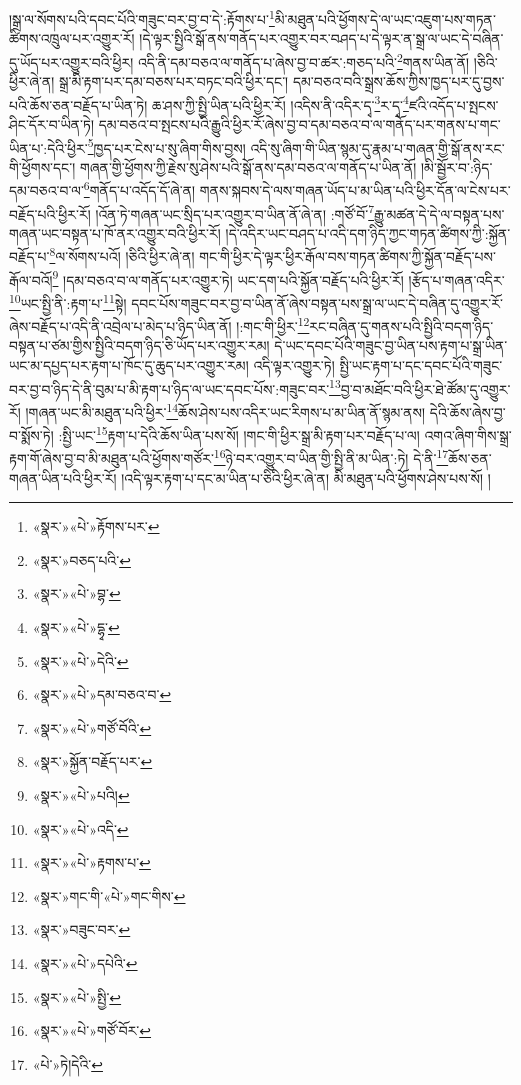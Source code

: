 །སྒྲ་ལ་སོགས་པའི་དབང་པོའི་གཟུང་བར་བྱ་བ་དེ་:རྟོགས་པ་\footnote{«སྣར་»«པེ་»རྟོགས་པར་}མི་མཐུན་པའི་ཕྱོགས་དེ་ལ་ཡང་འཇུག་པས་གཏན་ཚིགས་འཁྲུལ་པར་འགྱུར་རོ། །དེ་ལྟར་སྤྱིའི་སྒོ་ནས་གནོད་པར་འགྱུར་བར་བཤད་པ་དེ་ལྟར་ན་སྒྲ་ལ་ཡང་དེ་བཞིན་དུ་ཡོད་པར་འགྱུར་བའི་ཕྱིར། འདི་ནི་དམ་བཅའ་ལ་གནོད་པ་ཞེས་བྱ་བ་ཚར་:གཅད་པའི་\footnote{«སྣར་»བཅད་པའི་}གནས་ཡིན་ནོ། །ཅིའི་ཕྱིར་ཞེ་ན། སྒྲ་མི་རྟག་པར་དམ་བཅས་པར་བཏང་བའི་ཕྱིར་དང་། དམ་བཅའ་བའི་སྒྲས་ཆོས་ཀྱིས་ཁྱད་པར་དུ་བྱས་པའི་ཆོས་ཅན་བརྗོད་པ་ཡིན་ཏེ། ཆ་ཤས་ཀྱི་སྤྱི་ཡིན་པའི་ཕྱིར་རོ། །འདིས་ནི་འདིར་དྭ་\footnote{«སྣར་»«པེ་»བྷ་}ར་དྭ་\footnote{«སྣར་»«པེ་»དྷྭ་}ཛའི་འདོད་པ་སྤངས་ཤིང་དོར་བ་ཡིན་ཏེ། དམ་བཅའ་བ་སྤངས་པའི་རྒྱུའི་ཕྱིར་རོ་ཞེས་བྱ་བ་དམ་བཅའ་བ་ལ་གནོད་པར་གནས་པ་གང་ཡིན་པ་:དེའི་ཕྱིར་\footnote{«སྣར་»«པེ་»དེའི་}ཁྱད་པར་ངེས་པ་སུ་ཞིག་གིས་བྱས། འདི་སུ་ཞིག་གི་ཡིན་སྙམ་དུ་རྣམ་པ་གཞན་གྱི་སྒོ་ནས་རང་གི་ཕྱོགས་དང་། གཞན་གྱི་ཕྱོགས་ཀྱི་རྗེས་སུ་ཤེས་པའི་སྒོ་ནས་དམ་བཅའ་ལ་གནོད་པ་ཡིན་ནོ། །མི་སྦྱོར་བ་:ཉིད་དམ་བཅའ་བ་ལ་\footnote{«སྣར་»«པེ་»དམ་བཅའ་བ་}གནོད་པ་འདོད་དོ་ཞེ་ན། གནས་སྐབས་དེ་ལས་གཞན་ཡོད་པ་མ་ཡིན་པའི་ཕྱིར་དོན་ལ་ངེས་པར་བརྗོད་པའི་ཕྱིར་རོ། །འོན་ཏེ་གཞན་ཡང་སྲིད་པར་འགྱུར་བ་ཡིན་ནོ་ཞེ་ན། :གཙོ་བོ་\footnote{«སྣར་»«པེ་»གཙོ་བོའི་}རྒྱུ་མཚན་དེ་དེ་ལ་བསྟན་པས་གཞན་ཡང་བསྟན་པ་ཁོ་ནར་འགྱུར་བའི་ཕྱིར་རོ། །དེ་འདིར་ཡང་བཤད་པ་འདི་དག་ཉིད་ཀྱང་གཏན་ཚིགས་ཀྱི་:སྐྱོན་བརྗོད་པ་\footnote{«སྣར་»སྐྱོན་བརྗོད་པར་}ལ་སོགས་པའོ། །ཅིའི་ཕྱིར་ཞེ་ན། གང་གི་ཕྱིར་དེ་ལྟར་ཕྱིར་རྒོལ་བས་གཏན་ཚིགས་ཀྱི་སྐྱོན་བརྗོད་པས་རྒོལ་བའོ།\footnote{«སྣར་»«པེ་»པའི།} །དམ་བཅའ་བ་ལ་གནོད་པར་འགྱུར་ཏེ། ཡང་དག་པའི་སྐྱོན་བརྗོད་པའི་ཕྱིར་རོ། །རྩོད་པ་གཞན་འདིར་\footnote{«སྣར་»«པེ་»འདི་}ཡང་སྤྱི་ནི་:རྟག་པ་\footnote{«སྣར་»«པེ་»རྟགས་པ་}སྟེ། དབང་པོས་གཟུང་བར་བྱ་བ་ཡིན་ནོ་ཞེས་བསྟན་པས་སྒྲ་ལ་ཡང་དེ་བཞིན་དུ་འགྱུར་རོ་ཞེས་བརྗོད་པ་འདི་ནི་འབྲེལ་པ་མེད་པ་ཉིད་ཡིན་ནོ། །:གང་གི་ཕྱིར་\footnote{«སྣར་»གང་གི་«པེ་»གང་གིས་}རང་བཞིན་དུ་གནས་པའི་སྤྱིའི་བདག་ཉིད་བསྟན་པ་ཙམ་གྱིས་སྤྱིའི་བདག་ཉིད་ཅི་ཡོད་པར་འགྱུར་རམ། དེ་ཡང་དབང་པོའི་གཟུང་བྱ་ཡིན་པས་རྟག་པ་སྒྲ་ཡིན་ཡང་མ་དཔྱད་པར་རྟག་པ་ཁོང་དུ་ཆུད་པར་འགྱུར་རམ། འདི་ལྟར་འགྱུར་ཏེ། སྤྱི་ཡང་རྟག་པ་དང་དབང་པོའི་གཟུང་བར་བྱ་བ་ཉིད་དེ་ནི་བུམ་པ་མི་རྟག་པ་ཉིད་ལ་ཡང་དབང་པོས་:གཟུང་བར་\footnote{«སྣར་»བཟུང་བར་}བྱ་བ་མཐོང་བའི་ཕྱིར་ཐེ་ཚོམ་དུ་འགྱུར་རོ། །གཞན་ཡང་མི་མཐུན་པའི་ཕྱིར་\footnote{«སྣར་»«པེ་»དཔེའི་}ཆོས་ཤེས་པས་འདིར་ཡང་རིགས་པ་མ་ཡིན་ནོ་སྙམ་ནས། དེའི་ཆོས་ཞེས་བྱ་བ་སྨོས་ཏེ། :སྤྱི་ཡང་\footnote{«སྣར་»«པེ་»སྤྱི་}རྟག་པ་དེའི་ཆོས་ཡིན་པས་སོ། །གང་གི་ཕྱིར་སྒྲ་མི་རྟག་པར་བརྗོད་པ་ལ། འགའ་ཞིག་གིས་སྒྲ་རྟག་གོ་ཞེས་བྱ་བ་མི་མཐུན་པའི་ཕྱོགས་གཙོར་\footnote{«སྣར་»«པེ་»གཙོ་བོར་}ཉེ་བར་འགྱུར་བ་ཡིན་གྱི་སྤྱི་ནི་མ་ཡིན་:ཏེ། དེ་ནི་\footnote{«པེ་»ཏེ།དེའི་}ཆོས་ཅན་གཞན་ཡིན་པའི་ཕྱིར་རོ། །འདི་ལྟར་རྟག་པ་དང་མ་ཡིན་པ་ཅིའི་ཕྱིར་ཞེ་ན། མི་མཐུན་པའི་ཕྱོགས་ཤེས་པས་སོ། །
